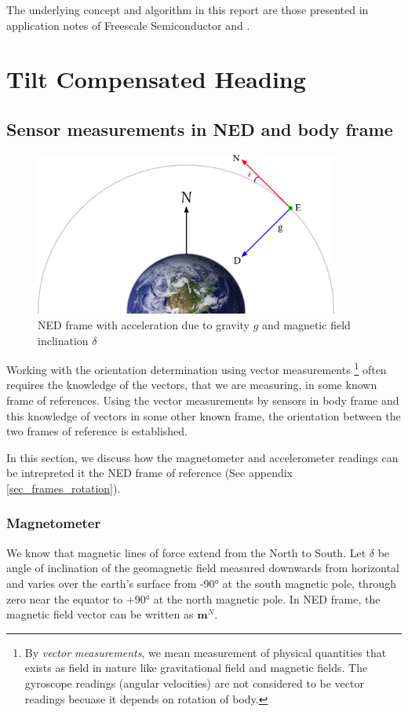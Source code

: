 \documentclass[12pt, a4paper]{article}
\begin{document}
The underlying concept and algorithm in this report are those presented in application notes of Freescale Semiconductor \cite{ozyagcilar2015} and \cite{pedley2013}.

\section{Tilt Compensated Heading}

\subsection{Sensor measurements in NED and body frame}

\begin{figure}
    \centering
    \includegraphics[width=10cm]{figs/fig_ned_frame.png}
    \caption{NED frame with acceleration due to gravity $g$ and magnetic field inclination $\delta$}
\end{figure}

\label{sec_vector_measurements}
Working with the orientation determination using vector measurements \footnote{By \textit{vector measurements}, we mean measurement of physical quantities that exists as field in nature like gravitational field and magnetic fields. The gyroscope readings (angular velocities) are not considered to be vector readings becuase it depends on rotation of body.}  often requires the knowledge of the vectors, that we are measuring, in some known frame of references. Using the vector measurements by sensors in body frame and this knowledge of vectors in some other known frame, the orientation between the two frames of reference is established. \medskip

In this section, we discuss how the magnetometer and accelerometer readings can be intrepreted it the NED frame of reference (See appendix \ref{sec_frames_rotation}).

\subsubsection*{Magnetometer}
We know that magnetic lines of force extend from the North to South. Let $\delta$ be angle of inclination of the geomagnetic field measured downwards from horizontal and varies over
the earth's surface from -90° at the south magnetic pole, through zero near the equator to +90° at the north magnetic pole. In NED frame, the magnetic field vector can be written as $\bm{m}^{N}$.
\end{document}
